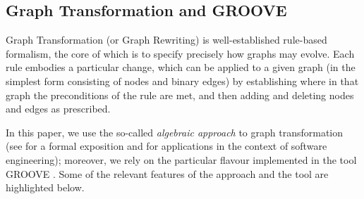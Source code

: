 
\subsection{Graph Transformation and GROOVE}\label{sec:GTS}

Graph Transformation (or Graph Rewriting) is well-established rule-based formalism, the core of which is to specify precisely how graphs may evolve. Each rule embodies a particular change, which can be applied to a given graph (in the simplest form consisting of nodes and binary edges) by establishing where in that graph the preconditions of the rule are met, and then adding and deleting nodes and edges as prescribed.

In this paper, we use the so-called \emph{algebraic approach} to graph transformation (see \cite{DBLP:series/eatcs/EhrigEPT06} for a formal exposition and \cite{DBLP:books/sp/HeckelT20} for applications in the context of software engineering); moreover, we rely on the particular flavour implemented in the tool GROOVE \cite{DBLP:journals/sttt/GhamarianMRZZ12,GROOVE}. Some of the relevant features of the approach and the tool are highlighted below.
%
%
%
%
